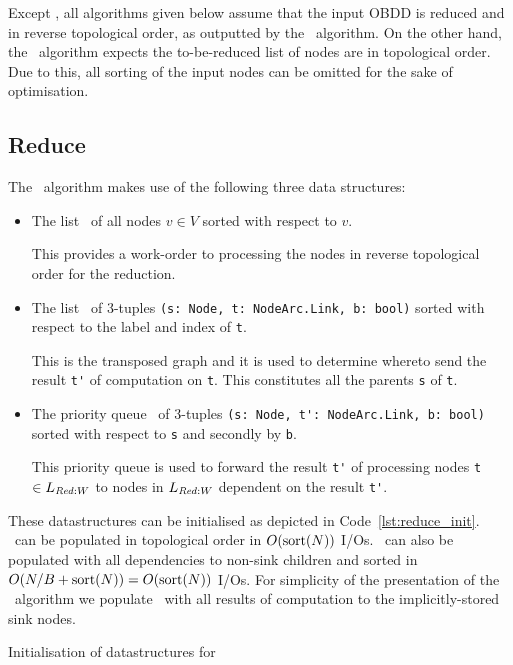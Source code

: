 Except \Reduce, all algorithms given below assume that the input OBDD is reduced
and in reverse topological order, as outputted by the \Reduce\ algorithm. On the
other hand, the \Reduce\ algorithm expects the to-be-reduced list of nodes are
in topological order. Due to this, all sorting of the input nodes can be omitted
for the sake of optimisation. \cite{Arge96}

\subsection{Reduce} \label{sec:theory__reduce}
The \Reduce\ algorithm makes use of the following three data structures:

\begin{itemize}
\item The list \ReduceLwork\ of all nodes $v \in V$ sorted with respect to $v$.

  This provides a work-order to processing the nodes in reverse topological
  order for the reduction.

\item The list \ReduceLdep\ of 3-tuples
  \lstinline{(s: Node, t: NodeArc.Link, b: bool)}
  sorted with respect to the label and index of \lstinline{t}.

  This is the transposed graph and it is used to determine whereto send the
  result \lstinline{t'} of computation on \lstinline{t}. This constitutes all
  the parents \lstinline{s} of \lstinline{t}.

\item The priority queue \ReduceQdep\ of 3-tuples
  \lstinline{(s: Node, t': NodeArc.Link, b: bool)} sorted with
  respect to \lstinline{s} and secondly by \lstinline{b}.

  This priority queue is used to forward the result \lstinline{t'} of processing
  nodes \lstinline{t} $\in L_{\mathit{Red:}W}$ to nodes in $L_{\mathit{Red:}W}$ dependent on
  the result \lstinline{t'}.
\end{itemize}
These datastructures can be initialised as depicted in
Code~\ref{lst:reduce_init}. \ReduceLwork\ can be populated in topological order
in $O(\text{sort}(N))$ I/Os. \ReduceLdep\ can also be populated with all dependencies
to non-sink children and sorted in $O(N/B + \text{sort}(N)) = O(\text{sort}(N))$ I/Os. For
simplicity of the presentation of the \Reduce\ algorithm we populate
\ReduceQdep\ with all results of computation to the implicitly-stored sink
nodes.

\begin{lstfloat}[ht!]
  \centering

  

  \caption{Initialisation of datastructures for \Reduce}
  \label{lst:reduce_init}
\end{lstfloat}

